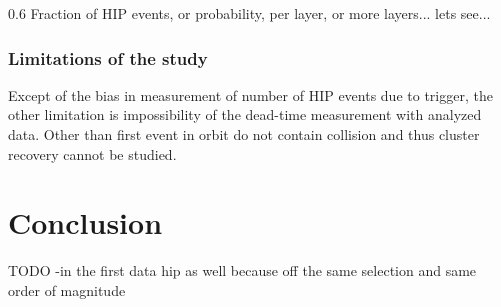 \begin{table}
\begin{center}
\caption[Table caption text]{Table of ... }
\label{tab:clusterCategories}
\end{center}
\end{table}


                 {0.6}       %
                 {Fraction of HIP events, or probability, per layer, or more layers... lets see... } %

\subsubsection{Limitations of the study}
 
Except of the bias in measurement of number of HIP events due to trigger, the other limitation is impossibility of the dead-time measurement with analyzed data. Other than first event in orbit do not contain collision and thus cluster recovery cannot be studied. 

\section{Conclusion}
TODO
-in the first data hip as well because off the same selection and same order of magnitude



